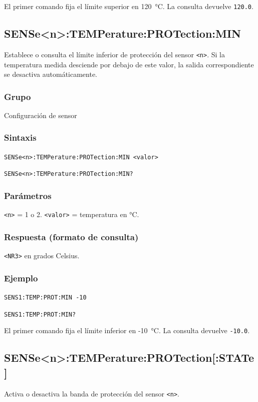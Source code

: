 El primer comando fija el límite superior en 120~°C. La consulta devuelve
\texttt{120.0}.

\subsection*{SENSe<n>:TEMPerature:PROTection:MIN}

Establece o consulta el límite inferior de protección del sensor
\texttt{<n>}. Si la temperatura medida desciende por debajo de este valor,
la salida correspondiente se desactiva automáticamente.

\subsubsection*{Grupo}
Configuración de sensor

\subsubsection*{Sintaxis}
\texttt{SENSe<n>:TEMPerature:PROTection:MIN <valor>}\par
\texttt{SENSe<n>:TEMPerature:PROTection:MIN?}

\subsubsection*{Parámetros}
\texttt{<n>} = 1 o 2. \texttt{<valor>} = temperatura en °C.

\subsubsection*{Respuesta (formato de consulta)}
\texttt{<NR3>} en grados Celsius.

\subsubsection*{Ejemplo}
\texttt{SENS1:TEMP:PROT:MIN -10}\par
\texttt{SENS1:TEMP:PROT:MIN?}

El primer comando fija el límite inferior en -10~°C. La consulta devuelve
\texttt{-10.0}.

\subsection*{SENSe<n>:TEMPerature:PROTection[:STATe]}

Activa o desactiva la banda de protección del sensor \texttt{<n>}.

